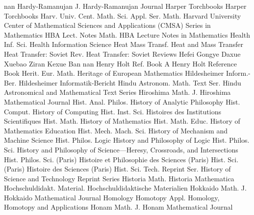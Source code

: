 {nan}
{Hardy-Ramanujan J.}
{Hardy-Ramanujan Journal}
{Harper Torchbooks}
{Harper Torchbooks}
{Harv. Univ. Cent. Math. Sci. Appl. Ser. Math.}
{Harvard University Center of Mathematical Sciences and Applications (CMSA) Series in Mathematics}
{HBA Lect. Notes Math.}
{HBA Lecture Notes in Mathematics}
{Health Inf. Sci.}
{Health Information Science}
{Heat Mass Transf.}
{Heat and Mass Transfer}
{Heat Transfer: Soviet Rev.}
{Heat Transfer: Soviet Reviews}
{Hefei Gongye Daxue Xuebao Ziran Kexue Ban}
{nan}
{Henry Holt Ref. Book}
{A Henry Holt Reference Book}
{Herit. Eur. Math.}
{Heritage of European Mathematics}
{Hildesheimer Inform.-Ber.}
{Hildesheimer Informatik-Bericht}
{Hindu Astronom. Math. Text Ser.}
{Hindu Astronomical and Mathematical Text Series}
{Hiroshima Math. J.}
{Hiroshima Mathematical Journal}
{Hist. Anal. Philos.}
{History of Analytic Philosophy}
{Hist. Comput.}
{History of Computing}
{Hist. Inst. Sci.}
{Histoires des Institutions Scientifiques}
{Hist. Math.}
{History of Mathematics}
{Hist. Math. Educ.}
{History of Mathematics Education}
{Hist. Mech. Mach. Sci.}
{History of Mechanism and Machine Science}
{Hist. Philos. Logic}
{History and Philosophy of Logic}
{Hist. Philos. Sci.}
{History and Philosophy of Science---Heresy, Crossroads, and Intersections}
{Hist. Philos. Sci. (Paris)}
{Histoire et Philosophie des Sciences (Paris)}
{Hist. Sci. (Paris)}
{Histoire des Sciences (Paris)}
{Hist. Sci. Tech. Reprint Ser.}
{History of Science and Technology Reprint Series}
{Historia Math.}
{Historia Mathematica}
{Hochschuldidakt. Material.}
{Hochschuldidaktische Materialien}
{Hokkaido Math. J.}
{Hokkaido Mathematical Journal}
{Homology Homotopy Appl.}
{Homology, Homotopy and Applications}
{Honam Math. J.}
{Honam Mathematical Journal}
